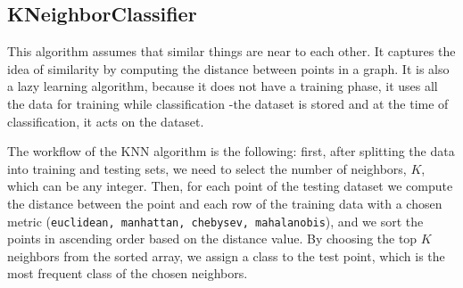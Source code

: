 \subsection*{KNeighborClassifier}

This algorithm assumes that similar things are near to each other.  It captures the idea of similarity by computing the distance between points in a graph.  It is also a lazy learning algorithm, because it does not have a training phase, it uses all the data for training while classification -the dataset is stored and at the time of classification, it acts on the dataset.

The workflow of the KNN algorithm is the following: first, after splitting the data into training and testing sets, we need to select the number of neighbors, $K$,  which can be any integer.  Then, for each point of the testing dataset we compute the distance between the point and each row of the training data with a chosen metric (\texttt{euclidean, manhattan, chebysev, mahalanobis}), and we sort the points in ascending order based on the distance value.  By choosing the top $K$ neighbors from the sorted array, we assign a class to the test point, which is the most frequent class of the chosen neighbors.
